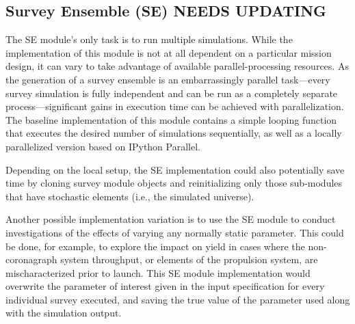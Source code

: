 \documentclass[cleanfoot]{asme2ej}
\begin{document}

\subsection{Survey Ensemble (SE) NEEDS UPDATING}
The SE module's only task is to run multiple simulations.  While the implementation of this module is not at all dependent on a particular mission design, it can vary to take advantage of available parallel-processing resources.  As the generation of a survey ensemble is an embarrassingly parallel task---every survey simulation is fully independent and can be run as a completely separate process---significant gains in execution time can be achieved with parallelization.  The baseline implementation of this module contains a simple looping function that executes the desired number of simulations sequentially, as well as a locally parallelized version based on IPython Parallel.

Depending on the local setup, the SE implementation could also potentially save time by cloning survey module objects and reinitializing only those sub-modules that have stochastic elements (i.e., the simulated universe).

Another possible implementation variation is to use the SE module to conduct investigations of the effects of varying any normally static parameter.  This could be done, for example, to explore the impact on yield in cases where the non-coronagraph system throughput, or elements of the propulsion system, are mischaracterized prior to launch.  This SE module implementation would overwrite the parameter of interest given in the input specification for every individual survey executed, and saving the true value of the parameter used along with the simulation output.
\end{document}
